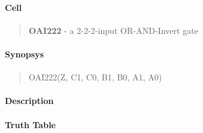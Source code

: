 \label{OAI222}
\paragraph{Cell}
\begin{quote}
    \textbf{OAI222} - a 2-2-2-input OR-AND-Invert gate
\end{quote}

\paragraph{Synopsys}
\begin{quote}
    OAI222(Z, C1, C0, B1, B0, A1, A0)
\end{quote}

\paragraph{Description}

%

\paragraph{Truth Table}


